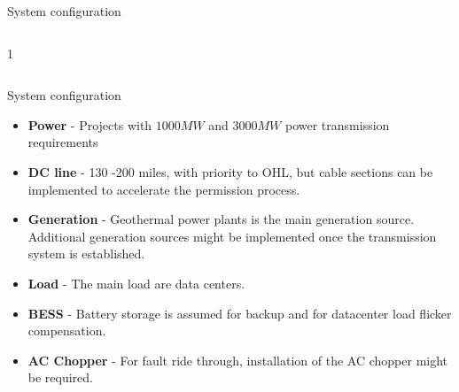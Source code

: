 

\begin{frame}{System configuration}
  \begin{columns}[c,onlytextwidth]
    \begin{column}{1\textwidth}
      \centering
    \end{column}
  \end{columns}
\end{frame}


\begin{frame}{System configuration}
  \begin{itemize}
    \setlength{\itemsep}{0.5em}
    \item \textbf{Power} - Projects with $1000MW$ and $3000MW$ power transmission requirements
    \item \textbf{DC line} - 130 -200 miles, with priority to OHL, but cable sections can be implemented to accelerate the permission process.
    \item \textbf{Generation} - Geothermal power plants is the main generation source. Additional generation sources might be implemented once the transmission system is established.
    \item \textbf{Load} - The main load are data centers.
    \item \textbf{BESS} - Battery storage is assumed for backup and for datacenter load flicker compensation.
    \item \textbf{AC Chopper} - For fault ride through, installation of the AC chopper might be required.
  \end{itemize}
\end{frame}


